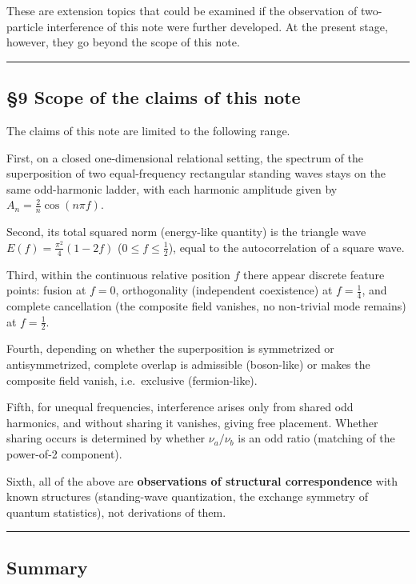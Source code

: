 \documentclass[
]{article}
\begin{document}
These are extension topics that could be examined if the observation of
two-particle interference of this note were further developed. At the
present stage, however, they go beyond the scope of this note.

\begin{center}\rule{0.5\linewidth}{0.5pt}\end{center}

\subsection{§9 Scope of the claims of this
note}\label{scope-of-the-claims-of-this-note}

The claims of this note are limited to the following range.

First, on a closed one-dimensional relational setting, the spectrum of
the superposition of two equal-frequency rectangular standing waves
stays on the same odd-harmonic ladder, with each harmonic amplitude
given by \(A_n=\tfrac{2}{n}\cos(n\pi f)\).

Second, its total squared norm (energy-like quantity) is the triangle
wave \(E(f)=\tfrac{\pi^2}{4}(1-2f)\) (\(0\le f\le\tfrac12\)), equal to
the autocorrelation of a square wave.

Third, within the continuous relative position \(f\) there appear
discrete feature points: fusion at \(f=0\), orthogonality (independent
coexistence) at \(f=\tfrac14\), and complete cancellation (the composite
field vanishes, no non-trivial mode remains) at \(f=\tfrac12\).

Fourth, depending on whether the superposition is symmetrized or
antisymmetrized, complete overlap is admissible (boson-like) or makes
the composite field vanish, i.e.~exclusive (fermion-like).

Fifth, for unequal frequencies, interference arises only from shared odd
harmonics, and without sharing it vanishes, giving free placement.
Whether sharing occurs is determined by whether \(\nu_a/\nu_b\) is an
odd ratio (matching of the power-of-2 component).

Sixth, all of the above are \textbf{observations of structural
correspondence} with known structures (standing-wave quantization, the
exchange symmetry of quantum statistics), not derivations of them.

\begin{center}\rule{0.5\linewidth}{0.5pt}\end{center}

\subsection{Summary}\label{summary}
\end{document}

